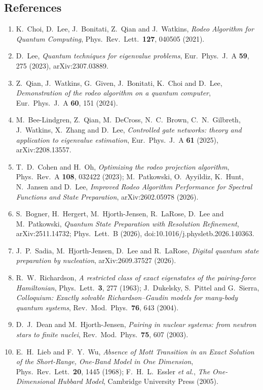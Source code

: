 \documentclass[12pt,a4paper]{article}
\begin{document}
\subsection*{References}

\begin{enumerate}
    \item K.~Choi, D.~Lee, J.~Bonitati, Z.~Qian and J.~Watkins, \textit{Rodeo Algorithm for Quantum Computing}, Phys.\ Rev.\ Lett.\ \textbf{127}, 040505 (2021).
    \item D.~Lee, \textit{Quantum techniques for eigenvalue problems}, Eur.\ Phys.\ J.\ A \textbf{59}, 275 (2023), arXiv:2307.03889.
    \item Z.~Qian, J.~Watkins, G.~Given, J.~Bonitati, K.~Choi and D.~Lee, \textit{Demonstration of the rodeo algorithm on a quantum computer}, Eur.\ Phys.\ J.\ A \textbf{60}, 151 (2024).
    \item M.~Bee-Lindgren, Z.~Qian, M.~DeCross, N.~C.~Brown, C.~N.~Gilbreth, J.~Watkins, X.~Zhang and D.~Lee, \textit{Controlled gate networks: theory and application to eigenvalue estimation}, Eur.\ Phys.\ J.\ A \textbf{61} (2025), arXiv:2208.13557.
    \item T.~D.~Cohen and H.~Oh, \textit{Optimizing the rodeo projection algorithm}, Phys.\ Rev.\ A \textbf{108}, 032422 (2023); M.~Patkowski, O.~Ayyildiz, K.~Hunt, N.~Jansen and D.~Lee, \textit{Improved Rodeo Algorithm Performance for Spectral Functions and State Preparation}, arXiv:2602.05978 (2026).
    \item S.~Bogner, H.~Hergert, M.~Hjorth-Jensen, R.~LaRose, D.~Lee and M.~Patkowski, \textit{Quantum State Preparation with Resolution Refinement}, arXiv:2511.14732; Phys.\ Lett.\ B (2026), doi:10.1016/j.physletb.2026.140363.
    \item J.~P.~Sadia, M.~Hjorth-Jensen, D.~Lee and R.~LaRose, \textit{Digital quantum state preparation by nucleation}, arXiv:2609.37527 (2026).
    \item R.~W.~Richardson, \textit{A restricted class of exact eigenstates of the pairing-force Hamiltonian}, Phys.\ Lett.\ \textbf{3}, 277 (1963); J.~Dukelsky, S.~Pittel and G.~Sierra, \textit{Colloquium: Exactly solvable Richardson--Gaudin models for many-body quantum systems}, Rev.\ Mod.\ Phys.\ \textbf{76}, 643 (2004).
    \item D.~J.~Dean and M.~Hjorth-Jensen, \textit{Pairing in nuclear systems: from neutron stars to finite nuclei}, Rev.\ Mod.\ Phys.\ \textbf{75}, 607 (2003).
    \item E.~H.~Lieb and F.~Y.~Wu, \textit{Absence of Mott Transition in an Exact Solution of the Short-Range, One-Band Model in One Dimension}, Phys.\ Rev.\ Lett.\ \textbf{20}, 1445 (1968); F.~H.~L.~Essler \textit{et al.}, \textit{The One-Dimensional Hubbard Model}, Cambridge University Press (2005).

\end{enumerate}
\end{document}
